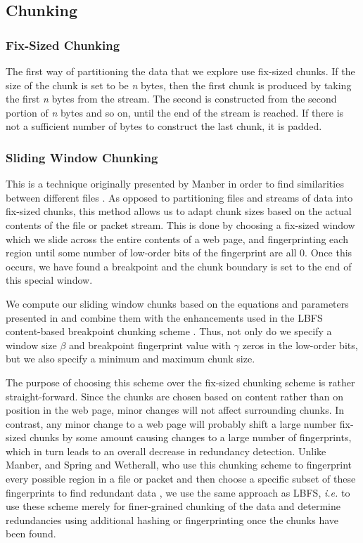 \subsection{Chunking}
\label{sec:chunking}
\subsubsection{Fix-Sized Chunking}
The first way of partitioning the data that we explore use fix-sized chunks. If the size of the chunk is set to be \textit{n} bytes, then the first chunk is produced by taking the first \textit{n}
bytes from the stream. The second is constructed from the second portion of \textit{n} bytes and so on, until the end of
the stream is reached. If there is not a sufficient number of bytes to construct the last chunk, it is padded.

\subsubsection{Sliding Window Chunking}
This is a technique originally presented by Manber in order to find similarities between different files \cite{manber}. As opposed to partitioning files and streams of data into fix-sized chunks, this method allows us to adapt chunk sizes based on the actual contents of the file or packet stream. This is done by choosing a fix-sized window which we slide across the entire contents of a web page, and fingerprinting each region until some number of low-order bits of the fingerprint are all 0. Once this occurs, we have found a breakpoint and the chunk boundary is set to the end of this special window. 

We compute our sliding window chunks based on the equations and parameters presented in \cite{spring} and combine them with the enhancements used in the LBFS content-based breakpoint chunking scheme \cite{lbfs}. Thus, not only do we specify a window size $\beta$ and breakpoint fingerprint value with $\gamma$ zeros in the low-order bits, but we also specify a minimum and maximum chunk size. 

The purpose of choosing this scheme over the fix-sized chunking scheme is rather straight-forward. Since the chunks are chosen based on content rather than on position in the web page, minor changes will not affect surrounding chunks. In contrast, any minor change to a web page will probably shift a large number fix-sized chunks by some amount causing changes to a large number of fingerprints, which in turn leads to an overall decrease in redundancy detection. Unlike Manber, and Spring and Wetherall, who use this chunking scheme to fingerprint every possible region in a file or packet and then choose a specific subset of these fingerprints to find redundant data \cite{manber,spring}, we use the same approach as LBFS, \textit{i.e.} to use these scheme merely for finer-grained chunking of the data and determine redundancies using additional hashing or fingerprinting once the chunks have been found.


